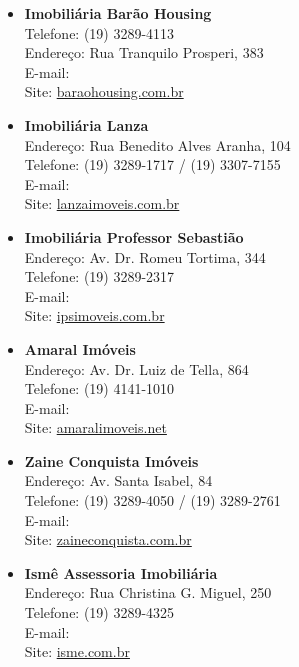 \begin{itemize}
    \item   \textbf{Imobiliária Barão Housing}
        \\Telefone: (19) 3289-4113
        \\Endereço: Rua Tranquilo Prosperi, 383
        \\E-mail: 
        \\Site: \url{baraohousing.com.br}

    \item   \textbf{Imobiliária Lanza}
        \\Endereço: Rua Benedito Alves Aranha, 104
        \\Telefone: (19) 3289-1717 / (19) 3307-7155
        \\E-mail: 
        \\Site: \url{lanzaimoveis.com.br}

    \item   \textbf{Imobiliária Professor Sebastião}
        \\Endereço: Av. Dr. Romeu Tortima, 344
        \\Telefone: (19) 3289-2317
        \\E-mail: 
        \\Site: \url{ipsimoveis.com.br}

    \item   \textbf{Amaral Imóveis}
        \\Endereço: Av. Dr. Luiz de Tella, 864
        \\Telefone: (19) 4141-1010
        \\E-mail: 
        \\Site: \url{amaralimoveis.net}

    \item   \textbf{Zaine Conquista Imóveis}
        \\Endereço: Av. Santa Isabel, 84
        \\Telefone: (19) 3289-4050 / (19) 3289-2761
        \\E-mail: 
        \\Site: \url{zaineconquista.com.br}

    \item   \textbf{Ismê Assessoria Imobiliária}
        \\Endereço: Rua Christina G. Miguel, 250
        \\Telefone: (19) 3289-4325
        \\E-mail: 
        \\Site: \url{isme.com.br}


\end{itemize}
